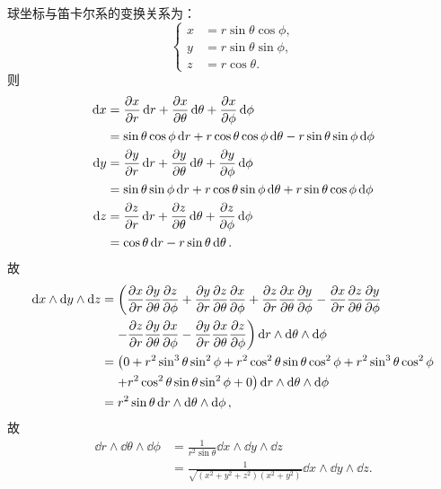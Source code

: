 \begin{xiti}
	\begin{jie}
		球坐标与笛卡尔系的变换关系为：
		\begin{displaymath}
		\left\{
		\begin{aligned}
		x&=r\sin \theta \cos \phi,\\
		y&=r\sin \theta \sin \phi,\\
		z&=r\cos \theta.
		\end{aligned}
		\right.
		\end{displaymath}
		则
		\begin{align*}
		\dd{x} &= \pdv{x}{r} \dd{r} + \pdv{x}{\theta} \dd{\theta} + \pdv{x}{\phi} \dd{\phi}\\
		&= \sin\theta \cos\phi \dd{r} + r \cos\theta \cos\phi \dd{\theta} - r \sin\theta \sin \phi \dd{\phi}\\
		\dd{y} &= \pdv{y}{r} \dd{r} + \pdv{y}{\theta} \dd{\theta} + \pdv{y}{\phi} \dd{\phi}\\
		&= \sin \theta \sin\phi \dd{r} + r \cos\theta \sin \phi \dd{\theta} + r \sin\theta \cos\phi \dd{\phi}\\
		\dd{z} &= \pdv{z}{r} \dd{r} + \pdv{z}{\theta} \dd{\theta} + \pdv{z}{\phi} \dd{\phi}\\
		&= \cos\theta \dd{r} - r\sin\theta \dd{\theta}.
		\end{align*}
		故
		\begin{align*}
		\dd{x} \wedge \dd{y} \wedge \dd{z} =&\mspace{2mu} \left( \pdv{x}{r} \pdv{y}{\theta} \pdv{z}{\phi} + \pdv{y}{r} \pdv{z}{\theta} \pdv{x}{\phi} + \pdv{z}{r} \pdv{x}{\theta} \pdv{y}{\phi} -\pdv{x}{r} \pdv{z}{\theta} \pdv{y}{\phi} \right. \\
		&\left. -\pdv{z}{r} \pdv{y}{\theta} \pdv{x}{\phi} - \pdv{y}{r} \pdv{x}{\theta} \pdv{z}{\phi} \right) \dd{r} \wedge \dd{\theta} \wedge \dd{\phi}\\
		=& \mspace{2mu} \left( 0 + r^2 \sin^3 \theta \sin^2 \phi + r^2 \cos^2 \theta \sin \theta \cos^2 \phi + r^2 \sin^3 \theta \cos^2 \phi  \right. \\
		&\left. + r^2 \cos^2 \theta \sin \theta \sin^2 \phi + 0 \right) \dd{r} \wedge \dd{\theta} \wedge \dd{\phi} \\
		=&\; r^2 \sin \theta \dd{r} \wedge \dd{\theta} \wedge \dd{\phi},
		\end{align*}
		故
		\begin{align*}
		\dd{r} \wedge \dd{\theta} \wedge \dd{\phi} &= \frac{1}{r^2 \sin\theta} \dd{x} \wedge \dd{y} \wedge \dd{z}\\
		&= \frac{1}{\sqrt{\left(x^2+y^2+z^2\right) \left(x^2+y^2\right)}} \dd{x} \wedge \dd{y} \wedge \dd{z}.
		\end{align*}
	\end{jie}


\end{xiti}
